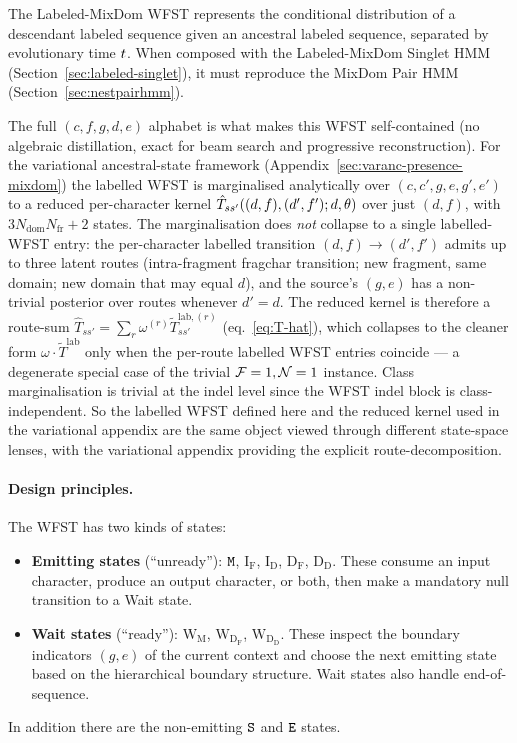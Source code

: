 The Labeled-MixDom WFST represents the conditional distribution of a descendant
labeled sequence given an ancestral labeled sequence, separated by evolutionary time $t$.
When composed with the Labeled-MixDom Singlet HMM (Section~\ref{sec:labeled-singlet}),
it must reproduce the MixDom Pair HMM (Section~\ref{sec:nestpairhmm}).

\begin{remark}
\label{rem:reduced-wfst-pointer}
The full $(c, f, g, d, e)$ alphabet is what makes this WFST self-contained
(no algebraic distillation, exact for beam search and progressive reconstruction).
For the variational ancestral-state framework
(Appendix~\ref{sec:varanc-presence-mixdom}) the labelled WFST is marginalised
analytically over $(c, c', g, e, g', e')$ to a reduced per-character kernel
$\hat{T}_{ss'}((d,f),(d',f'); d, \theta)$ over just $(d, f)$, with
$3 N_\text{dom} N_\text{fr} + 2$ states. The marginalisation does \emph{not}
collapse to a single labelled-WFST entry: the per-character
labelled transition $(d, f) \to (d', f')$ admits up to three latent routes
(intra-fragment fragchar transition; new fragment, same domain; new domain
that may equal $d$), and the source's $(g, e)$ has a non-trivial posterior
over routes whenever $d' = d$. The reduced kernel is therefore a route-sum
$\hat{T}_{ss'} = \sum_r \omega^{(r)} \tilde{T}^{\text{lab},(r)}_{ss'}$
(eq.~\eqref{eq:T-hat}), which collapses to the cleaner form
$\omega \cdot \tilde{T}^{\text{lab}}$ only when the per-route labelled WFST
entries coincide --- a degenerate special case of the trivial
$\mathcal{F} = 1, \mathcal{N} = 1$ instance.
Class marginalisation is trivial at the indel level since
the WFST indel block is class-independent. So the labelled WFST defined
here and the reduced kernel used in the variational appendix are the same
object viewed through different state-space lenses, with the variational
appendix providing the explicit route-decomposition.
\end{remark}

\paragraph{Design principles.}
The WFST has two kinds of states:
\begin{itemize}
\item \textbf{Emitting states} (``unready''): ${\tt M}$, $\mathrm{I_F}$, $\mathrm{I_D}$, $\mathrm{D_F}$, $\mathrm{D_D}$.
  These consume an input character, produce an output character, or both, then make a mandatory
  null transition to a Wait state.
\item \textbf{Wait states} (``ready''): $\mathrm{W_M}$, $\mathrm{W_{D_F}}$, $\mathrm{W_{D_D}}$.
  These inspect the boundary indicators $(g, e)$ of the current context and choose the next
  emitting state based on the hierarchical boundary structure.
  Wait states also handle end-of-sequence.
\end{itemize}
In addition there are the non-emitting ${\tt S}$ and ${\tt E}$ states.

